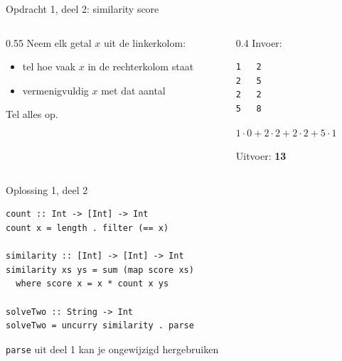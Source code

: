 \documentclass[aspectratio=169,11pt]{beamer}
\newcommand{\hs}{\lstinline[style=hsinline]}
\begin{document}
\begin{frame}[fragile]{Opdracht 1, deel 2: similarity score}
  \begin{columns}[T,onlytextwidth]
    \begin{column}{0.55\textwidth}
      Neem elk getal \(x\) uit de \alert{linkerkolom}:
      \begin{itemize}
        \item tel hoe vaak \(x\) in de rechterkolom staat
        \item vermenigvuldig \(x\) met dat aantal
      \end{itemize}
      Tel alles op.
    \end{column}
    \begin{column}{0.4\textwidth}
      Invoer:
\begin{lstlisting}
1   2
2   5
2   2
5   8
\end{lstlisting}
      \pause
      {\small \(1\cdot 0 + 2\cdot 2 + 2\cdot 2 + 5\cdot 1\)\par}
      \medskip
      Uitvoer: \alert{\textbf{13}}
    \end{column}
  \end{columns}
\end{frame}

\begin{frame}[fragile]{Oplossing 1, deel 2}
\begin{lstlisting}
count :: Int -> [Int] -> Int
count x = length . filter (== x)

similarity :: [Int] -> [Int] -> Int
similarity xs ys = sum (map score xs)
  where score x = x * count x ys

solveTwo :: String -> Int
solveTwo = uncurry similarity . parse
\end{lstlisting}
  \pause
  \hs|parse| uit deel 1 kan je \alert{ongewijzigd hergebruiken}
\end{frame}
\end{document}
